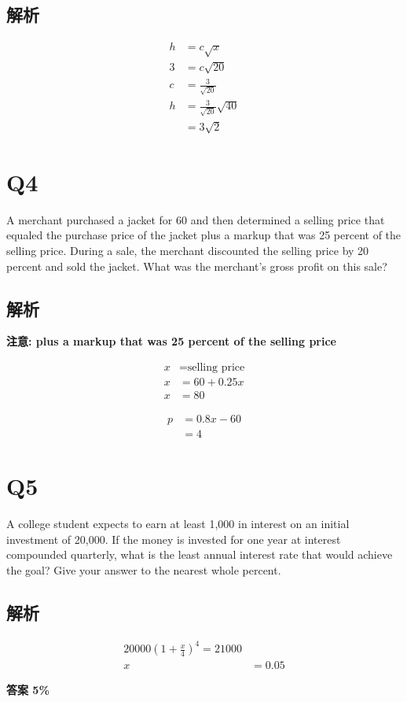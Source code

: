   \subsection{解析}

    \begin{align*}
      h &= c \sqrt{x} \\
      3 &= c \sqrt{20} \\
      c &= \frac{3}{\sqrt{20}} \\
      h &= \frac{3}{\sqrt{20}} \sqrt{40} \\
      &= 3 \sqrt{2}
    \end{align*}

\section{Q4}

  A merchant purchased a jacket for 60 and then determined a selling price
  that equaled the purchase price of the jacket plus a markup that was 25
  percent of the selling price. During a sale, the merchant discounted the
  selling price by 20 percent and sold the jacket. What was the merchant’s
  gross profit on this sale?

  \subsection{解析}

    \textbf{注意: plus a markup that was 25 percent of the selling price}

    \begin{align*}
      x &= \text{selling price} \\
      x &= 60 + 0.25 x \\
      x &= 80
    \end{align*}

    \begin{align*}
      p &= 0.8x - 60 \\
      &= 4
    \end{align*}

\section{Q5}

  A college student expects to earn at least 1,000 in interest on an initial
  investment of 20,000. If the money is invested for one year at interest
  compounded quarterly, what is the least annual interest rate that would
  achieve the goal? Give your answer to the nearest whole percent.

  \subsection{解析}

    \begin{align*}
      20000 \left( 1 + \frac{x}{4} \right)^{4} = 21000 \\
      x &= 0.05
    \end{align*}

    \textbf{答案 5\%}
